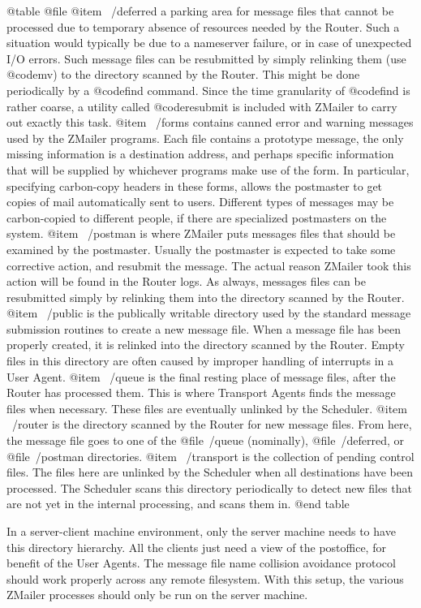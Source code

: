 @table @file
@item ~/deferred
a parking area for message files that cannot be processed due
to temporary absence of resources needed by the Router.
Such a situation would typically be due to a nameserver failure,
or in case of unexpected I/O errors.
Such message files can be resubmitted by simply relinking them
(use @code{mv}) to the directory scanned by the Router.
This might be done periodically by a @code{find} command.
Since the time granularity of @code{find} is rather coarse,
a utility called @code{resubmit} is included with ZMailer
to carry out exactly this task.
@item ~/forms
contains canned error and warning messages used by the ZMailer programs.
Each file contains a prototype message, the only missing information
is a destination address, and perhaps specific information that will
be supplied by whichever programs make use of the form.
In particular, specifying carbon-copy headers in these forms, allows the
postmaster to get copies of mail automatically sent to users.
Different types of messages may be carbon-copied to different people,
if there are specialized postmasters on the system.
@item ~/postman
is where ZMailer puts messages files that should be examined by
the postmaster.
Usually the postmaster is expected to take some corrective action,
and resubmit the message.
The actual reason ZMailer took this action will be found in
the Router logs.
As always, messages files can be resubmitted simply by relinking
them into the directory scanned by the Router.
@item ~/public
is the publically writable directory used by the standard message
submission routines to create a new message file.
When a message file has been properly created, it is relinked into
the directory scanned by the Router.
Empty files in this directory are often caused by improper handling
of interrupts in a User Agent.
@item ~/queue
is the final resting place of message files, after the Router has
processed them.
This is where Transport Agents finds the message files when necessary.
These files are eventually unlinked by the Scheduler.
@item ~/router
is the directory scanned by the Router for new message files.
From here, the message file goes to one of the @file{~/queue}
(nominally), @file{~/deferred}, or @file{~/postman} directories.
@item ~/transport
is the collection of pending control files.
The files here are unlinked by the Scheduler when all destinations
have been processed.
The Scheduler scans this directory periodically to detect new files
that are not yet in the internal processing, and scans them in.
@end table

In a server-client machine environment, only the server machine
needs to have this directory hierarchy.
All the clients just need a view of the postoffice, for benefit
of the User Agents.
The message file name collision avoidance protocol should work
properly across any remote filesystem.
With this setup, the various ZMailer processes should only be
run on the server machine.

